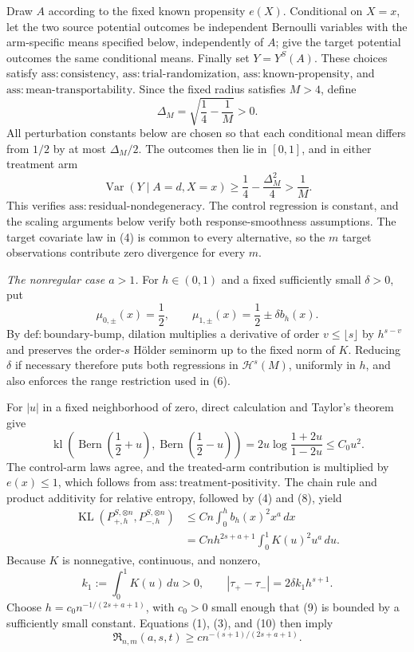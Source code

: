 Draw \(A\) according to the fixed known propensity \(e(X)\).  Conditional on \(X=x\), let the two source potential outcomes be independent Bernoulli variables with the arm-specific means specified below, independently of \(A\); give the target potential outcomes the same conditional means.  Finally set \(Y=Y^S(A)\).  These choices satisfy \(\mathrm{ass:consistency}\), \(\mathrm{ass:trial\text{-}randomization}\), \(\mathrm{ass:known\text{-}propensity}\), and \(\mathrm{ass:mean\text{-}transportability}\).  Since the fixed radius satisfies \(M>4\), define
\[
 \Delta_M=\sqrt{\frac14-\frac1M}>0.
\]
All perturbation constants below are chosen so that each conditional mean differs from \(1/2\) by at most \(\Delta_M/2\).  The outcomes then lie in \([0,1]\), and in either treatment arm
\[
 \operatorname{Var}(Y\mid A=d,X=x)
 \ge \frac14-\frac{\Delta_M^2}{4}
 >\frac1M.
\tag{6}
\]
This verifies \(\mathrm{ass:residual\text{-}nondegeneracy}\).  The control regression is constant, and the scaling arguments below verify both response-smoothness assumptions.  The target covariate law in (4) is common to every alternative, so the \(m\) target observations contribute zero divergence for every \(m\).

\emph{The nonregular case \(a>1\).}
For \(h\in(0,1)\) and a fixed sufficiently small \(\delta>0\), put
\[
 \mu_{0,\pm}(x)=\frac12,
 \qquad
 \mu_{1,\pm}(x)=\frac12\pm\delta b_h(x).
\tag{7}
\]
By \(\mathrm{def:boundary\text{-}bump}\), dilation multiplies a derivative of order \(v\le\lfloor s\rfloor\) by \(h^{s-v}\) and preserves the order-\(s\) H\"older seminorm up to the fixed norm of \(K\).  Reducing \(\delta\) if necessary therefore puts both regressions in \(\mathcal H^s(M)\), uniformly in \(h\), and also enforces the range restriction used in (6).

For \(|u|\) in a fixed neighborhood of zero, direct calculation and Taylor's theorem give
\[
 \operatorname{kl}\!\left(
  \operatorname{Bern}\left(\frac12+u\right),
  \operatorname{Bern}\left(\frac12-u\right)
 \right)
 =2u\log\frac{1+2u}{1-2u}
 \le C_0u^2.
\tag{8}
\]
The control-arm laws agree, and the treated-arm contribution is multiplied by \(e(x)\le1\), which follows from \(\mathrm{ass:treatment\text{-}positivity}\).  The chain rule and product additivity for relative entropy, followed by (4) and (8), yield
\[
 \begin{aligned}
 \operatorname{KL}(P_{+,h}^{S,\otimes n},P_{-,h}^{S,\otimes n})
 &\le Cn\int_0^h b_h(x)^2x^a\,dx\\
 &=Cnh^{2s+a+1}\int_0^1K(u)^2u^a\,du.
 \end{aligned}
\tag{9}
\]
Because \(K\) is nonnegative, continuous, and nonzero,
\[
 k_1:=\int_0^1K(u)\,du>0,
 \qquad
 |\tau_+-\tau_-|=2\delta k_1h^{s+1}.
\tag{10}
\]
Choose \(h=c_0n^{-1/(2s+a+1)}\), with \(c_0>0\) small enough that (9) is bounded by a sufficiently small constant.  Equations (1), (3), and (10) then imply
\[
 \mathfrak R_{n,m}(a,s,t)
 \ge c n^{-(s+1)/(2s+a+1)}.
\tag{11}
\]

